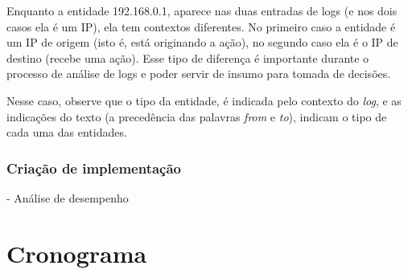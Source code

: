\documentclass[
	12pt,				%
	openright,			%
	twoside,			%
	a4paper,			%
	english,			%
	french,				%
	spanish,			%
	brazil,				%
	]{abntex2}
\begin{document}
Enquanto a entidade 192.168.0.1, aparece nas duas entradas de logs (e nos dois casos ela é um IP), ela tem contextos diferentes. No primeiro caso a entidade é um IP de origem (isto é, está originando a ação), no segundo caso ela é o IP de destino (recebe uma ação). Esse tipo de diferença é importante durante o processo de análise de logs e poder servir de insumo para tomada de decisões.

Nesse caso, observe que o tipo da entidade, é indicada pelo contexto do \emph{log}, e as indicações do texto (a precedência das palavras \emph{from} e \emph{to}), indicam o tipo de cada uma das entidades.

\cite{bird2009natural}

\subsection{Criação de implementação}

- Análise de desempenho

\chapter{Cronograma}\label{chap:cronograma}



\postextual



%
%




\printindex
\end{document}
